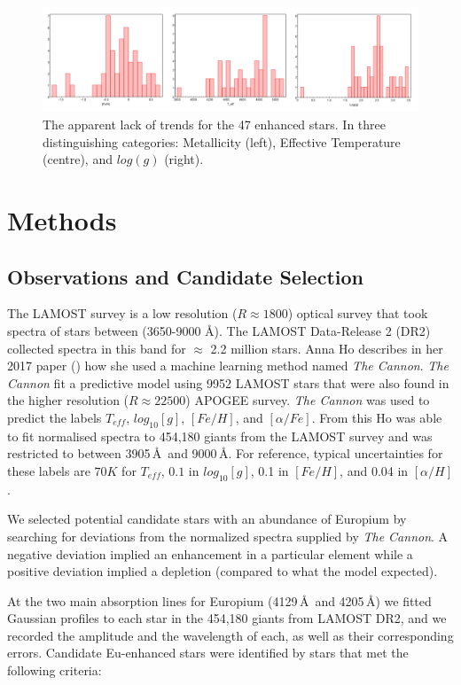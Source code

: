 \documentclass[a4paper,fleqn,usenatbib]{mnras}
\begin{document}
	\begin{figure}
		\includegraphics[width=\columnwidth]{NoTrend}
		\caption{The apparent lack of trends for the 47 enhanced stars. In three distinguishing categories: Metallicity (left), Effective Temperature (centre), and $log(g)$ (right).}
		\label{fig:starindex_423451}
	\end{figure}
	
	\section{Methods}
	
	\subsection{Observations and Candidate Selection}
	The LAMOST survey is a low resolution ($R\approx1800$) optical survey that took spectra of stars between (3650-9000 \AA). The LAMOST Data-Release 2 (DR2) collected spectra in this band for $\approx$ 2.2 million stars. Anna Ho describes in her 2017 paper (\cite{AnnaHo2017}) how she used a machine learning method named \textit{The Cannon}. \textit{The Cannon} fit a predictive model using 9952 LAMOST stars that were also found in the higher resolution ($R\approx22500$) APOGEE survey. \textit{The Cannon} was used to predict the labels $T_{eff}$, $log_{10}[g]$, $[Fe/H]$, and $[\alpha/Fe]$. From this Ho was able to fit normalised spectra to 454,180 giants from the LAMOST survey and was restricted to between 3905\,\AA\ and 9000\,\AA. For reference, typical uncertainties for these labels are $70K$ for $T_{eff}$, $0.1$ in $log_{10}[g]$, 0.1 in $[Fe/H]$, and 0.04 in $[\alpha/H]$.
	
	We selected potential candidate stars with an abundance of Europium by searching for deviations from the normalized spectra supplied by \textit{The Cannon}. A negative deviation implied an enhancement in a particular element while a positive deviation implied a depletion (compared to what the model expected). 
	
	At the two main absorption lines for Europium (4129\,\AA\ and 4205\,\AA) we fitted Gaussian profiles to each star in the 454,180 giants from LAMOST DR2, and we recorded the amplitude and the wavelength of each, as well as their corresponding errors. Candidate Eu-enhanced stars were identified by stars that met the following criteria:
	
\end{document}
